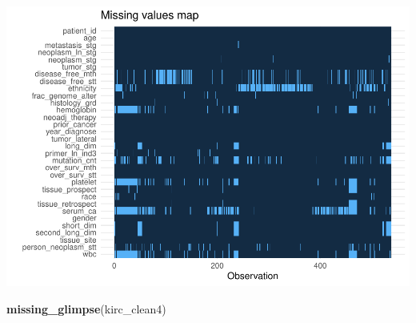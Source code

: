 \documentclass[]{article}
\newenvironment{Shaded}{\begin{snugshade}}{\end{snugshade}}
\newcommand{\KeywordTok}[1]{\textcolor[rgb]{0.13,0.29,0.53}{\textbf{#1}}}
\newcommand{\NormalTok}[1]{#1}
\begin{document}
\includegraphics{figs/render-unnamed-chunk-16-1.pdf}

\begin{Shaded}
\begin{Highlighting}[]
\KeywordTok{missing_glimpse}\NormalTok{(kirc_clean4)}
\end{Highlighting}
\end{Shaded}
\end{document}

